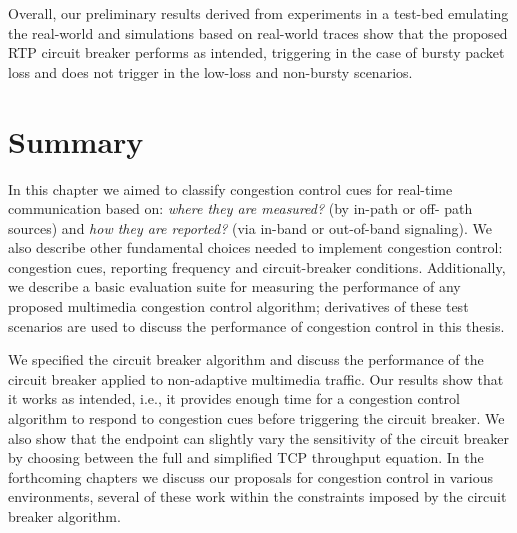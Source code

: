 Overall, our preliminary results derived from experiments in a test-bed
emulating the real-world and simulations based on real-world traces show that
the proposed RTP circuit breaker performs as intended, triggering in the case
of bursty  packet loss and does not trigger in the low-loss and non-bursty
scenarios. 



\section{Summary}

In this chapter we aimed to classify congestion control cues for real-time
communication based on: \emph{where they are measured?} (by in-path or  off-
path sources) and \emph{how they are reported?} (via in-band or out-of-band
signaling). We also describe other fundamental choices needed to implement
congestion control: congestion cues, reporting frequency and  circuit-breaker
conditions. Additionally, we describe a basic evaluation suite for measuring
the performance of any proposed multimedia congestion control algorithm;
derivatives of these test scenarios are used to discuss the performance of
congestion control in this thesis.

We specified the circuit breaker algorithm and discuss the performance of the
circuit breaker applied to non-adaptive multimedia traffic. Our results show
that it works as intended, i.e., it provides enough time for a congestion
control algorithm to respond to congestion cues before triggering the circuit
breaker. We also show that the endpoint can slightly vary the sensitivity of
the circuit breaker by choosing between the full and simplified TCP throughput
equation. In the forthcoming chapters we discuss our proposals for congestion
control in various environments, several of these work within the constraints
imposed by the circuit breaker algorithm.


